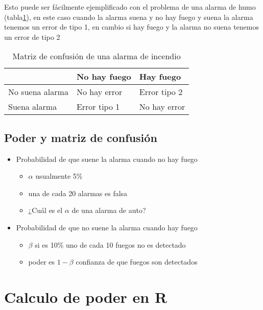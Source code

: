 \documentclass[]{book}
\providecommand{\tightlist}{%
  \setlength{\itemsep}{0pt}\setlength{\parskip}{0pt}}
\begin{document}
Esto puede ser fácilmente ejemplificado con el problema de una alarma de
humo (tabla\ref{tab:Confucion}), en este caso cuando la alarma suena y
no hay fuego y suena la alarma tenemos un error de tipo 1, en cambio si
hay fuego y la alarma no suena tenemos un error de tipo 2

\begin{table}

\caption{\label{tab:Confucion}Matriz de confusión de una alarma de incendio}
\centering
\begin{tabular}[t]{lll}
\toprule
  & No hay fuego & Hay fuego\\
\midrule
No suena alarma & No hay error & Error tipo 2\\
Suena alarma & Error tipo 1 & No hay error\\
\bottomrule
\end{tabular}
\end{table}

\subsection{Poder y matriz de
confusión}\label{poder-y-matriz-de-confusion}

\begin{itemize}
\tightlist
\item
  Probabilidad de que suene la alarma cuando no hay fuego

  \begin{itemize}
  \tightlist
  \item
    \(\alpha\) usualmente 5\%
  \item
    una de cada 20 alarmas es falsa
  \item
    ¿Cuál es el \(\alpha\) de una alarma de auto?
  \end{itemize}
\item
  Probabilidad de que no suene la alarma cuando hay fuego

  \begin{itemize}
  \tightlist
  \item
    \(\beta\) si es 10\% uno de cada 10 fuegos no es detectado
  \item
    poder es \(1-\beta\) confianza de que fuegos son detectados
  \end{itemize}
\end{itemize}

\section{Calculo de poder en R}\label{calculo-de-poder-en-r}
\end{document}
